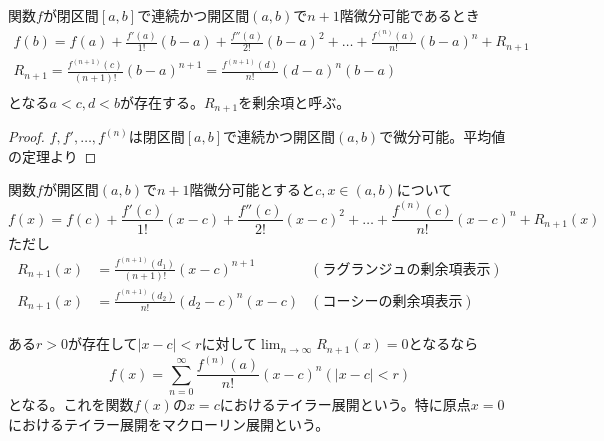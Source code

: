 	\begin{thm}[テイラーの定理]
		関数$f$が閉区間$[a, b]$で連続かつ開区間$(a, b)$で$n+1$階微分可能であるとき
		\begin{gather*}
			f(b) = f(a) + \frac{f'(a)}{1!}(b - a) + \frac{f''(a)}{2!}(b - a)^2 + \dots + \frac{f^{(n)}(a)}{n!}(b - a)^n + R_{n+1}\\
			R_{n+1} = \frac{f^{(n+1)}(c)}{(n+1)!}(b - a)^{n+1} = \frac{f^{(n+1)}(d)}{n!}(d - a)^n(b - a)\\
		\end{gather*}
		となる$a < c,d < b$が存在する。$R_{n+1}$を剰余項と呼ぶ。
	\end{thm}
	\begin{proof}
		$f, f', \dots, f^{(n)}$は閉区間$[a, b]$で連続かつ開区間$(a, b)$で微分可能。平均値の定理より
	\end{proof}

	\begin{cor}
		関数$f$が開区間$(a, b)$で$n+1$階微分可能とすると$c, x \in (a, b)$について
			\[f(x) = f(c) + \frac{f'(c)}{1!}(x - c) + \frac{f''(c)}{2!}(x - c)^2 + \dots + \frac{f^{(n)}(c)}{n!}(x - c)^n + R_{n+1}(x)\]
		ただし
		\begin{align*}
			R_{n+1}(x) &= \frac{f^{(n+1)}(d_1)}{(n+1)!}(x - c)^{n+1} & (ラグランジュの剰余項表示)\\
			R_{n+1}(x) &= \frac{f^{(n+1)}(d_2)}{n!}(d_2 - c)^n(x - c) & (コーシーの剰余項表示)\\
		\end{align*}
	\end{cor}

	ある$r > 0$が存在して$|x - c| < r$に対して$\lim_{n \to \infty} R_{n+1}(x) = 0$となるなら
		\[f(x) = \sum_{n = 0}^\infty \frac{f^{(n)}(a)}{n!}(x - c)^n (|x - c| < r)\]
	となる。これを関数$f(x)$の$x = c$におけるテイラー展開という。特に原点$x = 0$におけるテイラー展開をマクローリン展開という。

